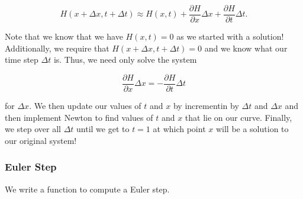 \documentclass[11pt]{article}
\begin{document}
\[
    H(x + \Delta x, t + \Delta t) \approx H(x,t) + \frac{\partial H}{\partial x} \Delta x
 + \frac{\partial H}{\partial t} \Delta t. 
 \]

Note that we know that we have \(H(x,t) = 0\) as we started with a
solution! Additionally, we require that
\(H(x + \Delta x, t + \Delta t) = 0\) and we know what our time step
\(\Delta t\) is. Thus, we need only solve the system

\[
    \frac{\partial H}{\partial x} \Delta x = -\frac{\partial H}{\partial t} \Delta t
\]

for \(\Delta x\). We then update our values of \(t\) and \(x\) by
incrementin by \(\Delta t\) and \(\Delta x\) and then implement Newton
to find values of \(t\) and \(x\) that lie on our curve. Finally, we
step over all \(\Delta t\) until we get to \(t = 1\) at which point
\(x\) will be a solution to our original system!

    \hypertarget{euler-step}{%
\subsubsection{Euler Step}\label{euler-step}}

We write a function to compute a Euler step.
\end{document}
